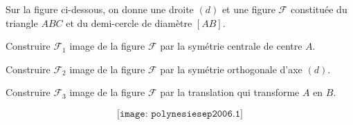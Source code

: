 Sur la figure ci-dessous, on donne une droite $(d)$ et une figure $\mathscr{F}$ constituée du triangle $ABC$ et du demi-cercle de diamètre $[AB]$.
\begin{myenumerate}
\item Construire $\mathscr{F}_1$ image de la figure $\mathscr{F}$ par la symétrie centrale de centre $A$.
\item Construire $\mathscr{F}_2$ image de la figure $\mathscr{F}$ par la symétrie orthogonale d'axe $(d)$.
\item Construire $\mathscr{F}_3$ image de la figure $\mathscr{F}$ par la translation qui transforme $A$ en $B$.
\end{myenumerate}
\[\texttt{[image: polynesiesep2006.1]}\]